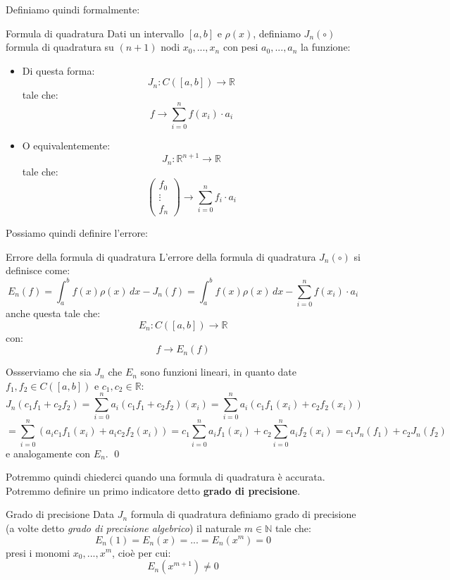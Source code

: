 \documentclass[a4paper,11pt]{article}
\begin{document}
Definiamo quindi formalmente:
\begin{definition}{Formula di quadratura}
	Dati un intervallo $[a, b]$ e $\rho(x)$, definiamo $J_n(\circ)$ formula di quadratura su $(n + 1)$ nodi $x_0, ..., x_n$ con pesi $a_0, ..., a_n$ la funzione:
	\begin{itemize}
		\item Di questa forma:
	$$
	J_n : C\left([a, b]\right) \rightarrow \mathbb{R}
	$$
	tale che:
	$$
	f \rightarrow \sum_{i=0}^n f(x_i) \cdot a_i
	$$
		\item
	O equivalentemente:
	$$
	J_n : \mathbb{R}^{n + 1} \rightarrow \mathbb{R}
	$$
	tale che:
	$$
	\begin{pmatrix}
		f_0 \\ \vdots \\ f_n
	\end{pmatrix} 
	\rightarrow
	\sum_{i=0}^n f_i \cdot a_i
	$$
	\end{itemize}
\end{definition}

Possiamo quindi definire l'errore:
\begin{definition}{Errore della formula di quadratura}
	L'errore della formula di quadratura $J_n(\circ)$ si definisce come:
	$$
	E_n(f) = \int_a^b f(x) \rho(x) \, dx - J_n(f) = \int_a^b f(x) \rho(x) \, dx - \sum_{i = 0}^n f(x_i) \cdot a_i
	$$
	anche questa tale che:
	$$
	E_n : C\left([a, b]\right) \rightarrow \mathbb{R}
	$$
	con:
	$$
	f \rightarrow E_n(f)
	$$
\end{definition}

Ossserviamo che sia $J_n$ che $E_n$ sono funzioni lineari, in quanto date $f_1, f_2 \in C\left([a, b]\right)$ e $c_1, c_2 \in \mathbb{R}$:
$$
J_n (c_1 f_1 + c_2 f_2) = \sum_{i = 0}^n a_i (c_1 f_1 + c_2 f_2)(x_i) 
= \sum_{i = 0}^n a_i ( c_1 f_1(x_i) + c_2 f_2(x_i) )
$$
$$
= \sum_{i = 0}^n \left( a_i c_1 f_1 (x_i) + a_i c_2 f_2 (x_i) \right)
= c_1 \sum_{i = 0}^n a_i f_1 (x_i) + c_2 \sum_{i = 0}^n a_i f_2 (x_i)
= c_1 J_n(f_1) + c_2 J_n(f_2)
$$
e analogamente con $E_n$. \qed

Potremmo quindi chiederci quando una formula di quadratura è accurata.
Potremmo definire un primo indicatore detto \textbf{grado di precisione}.
\begin{definition}{Grado di precisione}
	Data $J_n$ formula di quadratura definiamo grado di precisione (a volte detto \textit{grado di precisione algebrico}) il naturale $m \in \mathbb{N}$ tale che:
	$$
		E_n(1) = E_n(x) = ... = E_n (x^m) = 0
	$$
	presi i monomi $x_0, ..., x^m$, cioè per cui:
	$$
	E_n(x^{m + 1}) \neq 0
	$$
\end{definition}
\end{document}
